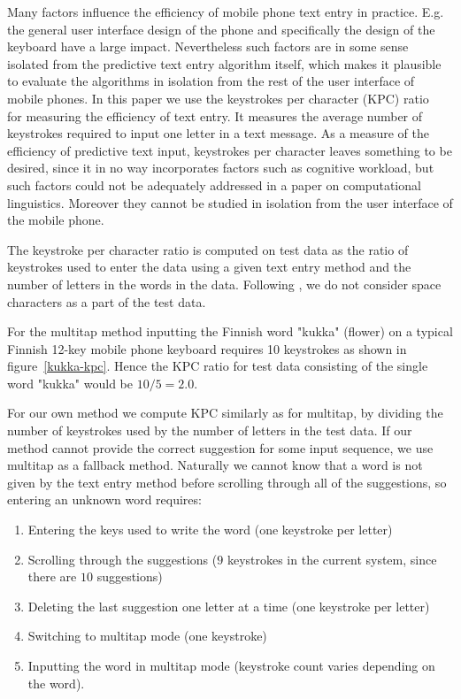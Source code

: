 \documentclass{llncs}
\begin{document}
Many factors influence the efficiency of mobile phone text entry in
practice. E.g. the general user interface design of the phone and
specifically the design of the keyboard have a large
impact. Nevertheless such factors are in some sense isolated from the
predictive text entry algorithm itself, which makes it plausible to
evaluate the algorithms in isolation from the rest of the user
interface of mobile phones. In this paper we use the keystrokes per
character (KPC) ratio~\cite{MacKenzie02kspc} for measuring the
efficiency of text entry. It measures the average number of keystrokes
required to input one letter in a text message. As a measure of the
efficiency of predictive text input, keystrokes per character leaves
something to be desired, since it in no way incorporates factors such
as cognitive workload, but such factors could not be adequately
addressed in a paper on computational linguistics. Moreover they
cannot be studied in isolation from the user interface of the mobile
phone.

The keystroke per character ratio is computed on test data as the
ratio of keystrokes used to enter the data using a given text entry
method and the number of letters in the words in the data. Following
\cite{Tantug:2010}, we do not consider space characters as a part of
the test data.

For the multitap method inputting the Finnish word "kukka" (flower) on
a typical Finnish 12-key mobile phone keyboard requires 10 keystrokes
as shown in figure~\ref{kukka-kpc}. Hence the KPC ratio for test data
consisting of the single word "kukka" would be $10/5 = 2.0$.

For our own method we compute KPC similarly as for multitap, by
dividing the number of keystrokes used by the number of letters in the
test data. If our method cannot provide the correct suggestion for
some input sequence, we use multitap as a fallback method. Naturally
we cannot know that a word is not given by the text entry method
before scrolling through all of the suggestions, so entering an
unknown word requires:
\begin{enumerate}
\item Entering the keys used to write the word (one keystroke per letter)
\item Scrolling through the suggestions ($9$ keystrokes in the current system, since there are $10$ suggestions)
\item Deleting the last suggestion one letter at a time (one keystroke per letter)
\item Switching to multitap mode (one keystroke)
\item Inputting the word in multitap mode (keystroke count varies depending on the word).
\end{enumerate}
\end{document}
